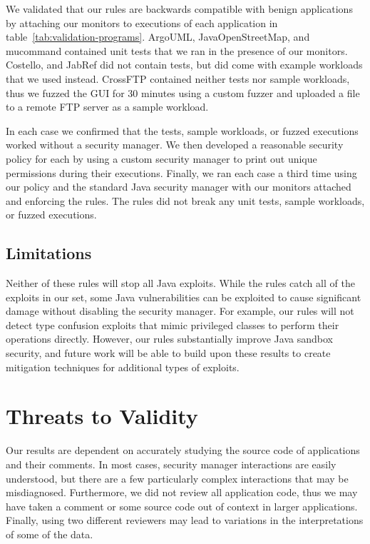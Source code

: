 \documentclass{sig-alternate}
\begin{document}
We validated that our rules are backwards compatible with benign applications by attaching our monitors to executions of each application in table~\ref{tab:validation-programs}. ArgoUML, JavaOpenStreetMap, and mucommand contained unit tests that we ran in the presence of our monitors. Costello, and JabRef did not contain tests, but did come with example workloads that we used instead. CrossFTP contained neither tests nor sample workloads, thus we fuzzed the GUI for 30 minutes using a custom fuzzer and uploaded a file to a remote FTP server as a sample workload.  

In each case we confirmed that the tests, sample workloads, or fuzzed executions worked without a security manager. We then developed a reasonable security policy for each by using a custom security manager to print out unique permissions during their executions. Finally, we ran each case a third time using our policy and the standard Java security manager with our monitors attached and enforcing the rules. The rules did not break any unit tests, sample workloads, or fuzzed executions.

\subsection{Limitations}

Neither of these rules will stop all Java exploits. While the rules
catch all of the exploits in our set, some Java vulnerabilities can
be exploited to cause significant damage without disabling the security
manager. For example, our rules will not detect type confusion exploits
that mimic privileged classes to perform their operations directly.
However, our rules substantially improve Java sandbox security, and
future work will be able to build upon these results to create mitigation
techniques for additional types of exploits.

\section{Threats to Validity}

Our results are dependent on accurately studying the source code of
applications and their comments. In most cases, security manager interactions
are easily understood, but there are a few particularly complex interactions
that may be misdiagnosed. Furthermore, we did not review all application
code, thus we may have taken a comment or some source code out of
context in larger applications. Finally, using two different reviewers
may lead to variations in the interpretations of some of the data. 
\end{document}
